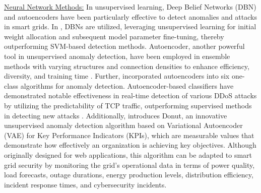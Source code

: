 \documentclass[10pt, journal]{IEEEtran}
\begin{document}
\underline{Neural Network Methods:}
In unsupervised learning, Deep Belief Networks (DBN) and autoencoders have been particularly effective to detect anomalies and attacks in smart grids. In \cite{karimipour2019deep, wei2018false}, DBNs are utilized, leveraging unsupervised learning for initial weight allocation and subsequent model parameter fine-tuning, thereby outperforming SVM-based detection methods. Autoencoder, another powerful tool in unsupervised anomaly detection, have been employed in ensemble methods with varying structures and connection densities to enhance efficiency, diversity, and training time \cite{chen2017outlier}. Further, \cite{meira2020performance} incorporated autoencoders into six one-class algorithms for anomaly detection. Autoencoder-based classifiers have demonstrated notable effectiveness in real-time detection of various DDoS attacks by utilizing the predictability of TCP traffic, outperforming supervised methods in detecting new attacks \cite{bhatia2019unsupervised}. Additionally, \cite{xu2018unsupervised} introduces Donut, an innovative unsupervised anomaly detection algorithm based on Variational Autoencoder (VAE) for Key Performance Indicators (KPIs), which are measurable values that demonstrate how effectively an organization is achieving key objectives. Although originally designed for web applications, this algorithm can be adapted to smart grid security by monitoring the grid's operational data in terms of power quality, load forecasts, outage durations, energy production levels, distribution efficiency, incident response times, and cybersecurity incidents.
				
\end{document}
